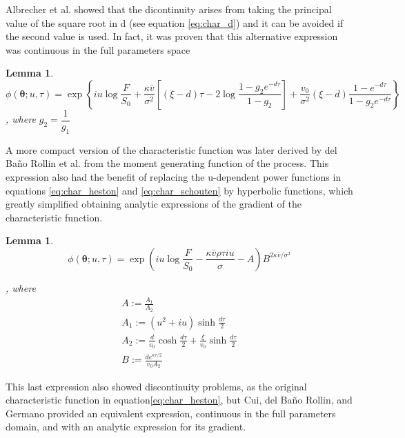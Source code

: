 \documentclass[12,twoside]{mammeTFM}
\newtheorem{lem}[thm]{Lemma}
\theoremstyle{definition}
\theoremstyle{remark}
\begin{document}
Albrecher et al. \cite{alb07} showed that the dicontinuity arises from taking the principal value of the square root in d (see equation \ref{eq:char_d}) and it can be avoided if the second value is used. In fact, it was proven that this alternative expression was continuous in the full parameters space \cite{sch04}

\begin{lem}
\begin{equation} \label{eq:char_schouten}
\phi(\boldsymbol{\theta} ; u, \tau)=\exp \left\{i u \log \frac{F}{S_{0}}
+\frac{\kappa \bar{v}}{\sigma^{2}}\left[(\xi-d) \tau-2 \log \frac{1-g_{2} e^{-d \tau}}{1-g_{2}}\right]+\frac{v_{0}}{\sigma^{2}}(\xi-d) \frac{1-e^{-d \tau}}{1-g_{2} e^{-d \tau}}\right\} 
\end{equation}
, where $g_2 = \dfrac{1}{g_1}$
\end{lem}

A more compact version of the characteristic function was later derived by del Ba\~no Rollin et al. \cite{rol10} from the moment generating function of the process. This expression also had the benefit of replacing the u-dependent power functions in equations \ref{eq:char_heston} and \ref{eq:char_schouten} by hyperbolic functions, which greatly simplified obtaining analytic expressions of the gradient of the characteristic function.

\begin{lem}
\begin{equation}
\phi(\boldsymbol{\theta} ; u, \tau)=\exp \left(i u \log \frac{F}{S_{0}}-\frac{\kappa \bar{v} \rho \tau i u}{\sigma}-A\right) B^{2 \kappa \bar{v} / \sigma^{2}}
\end{equation}

, where
\begin{equation}\begin{array}{l}
A:=\frac{A_{1}}{A_{2}} \\
A_{1}:=\left(u^{2}+i u\right) \sinh \frac{d \tau}{2} \\
A_{2}:=\frac{d}{v_{0}} \cosh \frac{d \tau}{2}+\frac{\xi}{v_{0}} \sinh \frac{d \tau}{2} \\
B:=\frac{d e^{\kappa \tau / 2}}{v_{0} A_{2}}
\end{array}\end{equation}
\end{lem}

This last expression also showed discontinuity problems, as the original characteristic function in equation\ref{eq:char_heston}, but Cui, del Ba\~no Rollin, and Germano provided an equivalent expression, continuous in the full parameters domain, and with an analytic expression for its gradient.
\end{document}

